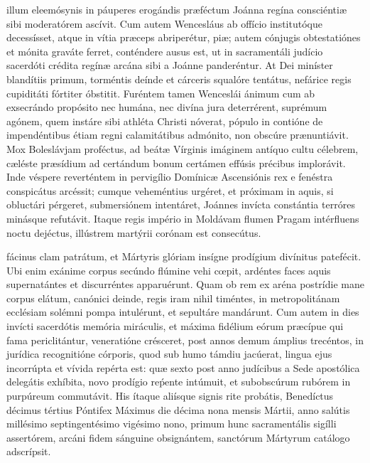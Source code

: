 \documentclass[fontsize=9pt,paper=A6,twoside,BCOR=1mm,DIV=22,headinclude]{scrarticle}
\begin{document}
\begin{multicols}{2}
{
 illum eleemósynis in páuperes erogándis præféctum Joánna regína consciéntiæ sibi moderatórem ascívit. Cum autem Wencesláus ab offício institutóque decessísset, atque in vítia præceps abriperétur, piæ; autem cónjugis obtestatiónes et mónita graváte ferret, conténdere ausus est, ut in sacramentáli judício sacerdóti crédita regínæ arcána sibi a Joánne panderéntur. At Dei miníster blandítiis primum, torméntis deínde et cárceris squalóre tentátus, nefárice regis cupiditáti fórtiter óbstitit. Furéntem tamen Wenceslái ánimum cum ab exsecrándo propósito nec humána, nec divína jura deterrérent, suprémum agónem, quem instáre sibi athléta Christi nóverat, pópulo in contióne de impendéntibus étiam regni calamitátibus admónito, non obscúre prænuntiávit. Mox Boleslávjam proféctus, ad beátæ Vírginis imáginem antíquo cultu célebrem, cæléste præsídium ad certándum bonum certámen effúsis précibus implorávit. Inde véspere reverténtem in pervigílio Domínicæ Ascensiónis rex e fenéstra conspicátus arcéssit; cumque veheméntius urgéret, et próximam in aquis, si obluctári pérgeret, submersiónem intentáret, Joánnes invícta constántia terróres minásque refutávit. Itaque regis império in Moldávam flumen Pragam intérfluens noctu dejéctus, illústrem martýrii corónam est consecútus.

\RVMTPv 

}

 fácinus clam patrátum, et Mártyris glóriam insígne prodígium divínitus patefécit. Ubi enim exánime corpus secúndo flúmine vehi cœpit, ardéntes faces aquis supernatántes et discurréntes apparuérunt. Quam ob rem ex aréna postrídie mane corpus elátum, canónici deinde, regis iram nihil timéntes, in metropolitánam ecclésiam solémni pompa intulérunt, et sepultáre mandárunt. Cum autem in dies invícti sacerdótis memória miráculis, et máxima fidélium eórum præcípue qui fama periclitántur, veneratióne crésceret, post annos demum ámplius trecéntos, in jurídica recognitióne córporis, quod sub humo támdiu jacúerat, lingua ejus incorrúpta et vívida repérta est: quæ sexto post anno judícibus a Sede apostólica delegátis exhíbita, novo prodígio reṕente intúmuit, et subobscúrum rubórem in purpúreum commutávit. His ítaque aliísque signis rite probátis, Benedíctus décimus tértius Póntifex Máximus die décima nona mensis Mártii, anno salútis millésimo septingentésimo vigésimo nono, primum hunc sacramentális sigílli assertórem, arcáni fidem sánguine obsignántem, sanctórum Mártyrum catálogo adscrípsit.


\end{multicols}
\end{document}
